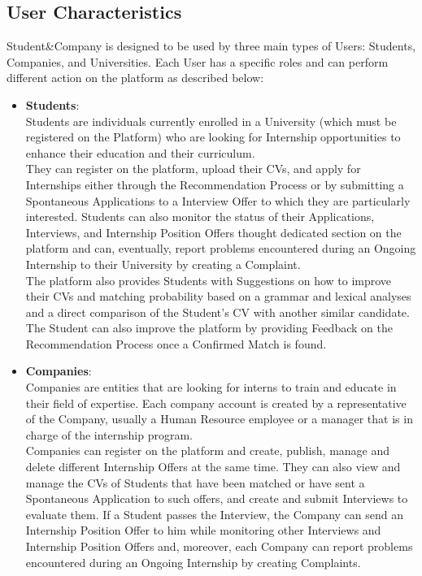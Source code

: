 \subsection{User Characteristics}
Student\&Company is designed to be used by three main types of Users: Students, Companies, and Universities. Each User has a specific roles and can perform different action on the platform as described below:
\begin{itemize}
  \item \textbf{Students}: \\
    Students are individuals currently enrolled in a University (which must be registered on the Platform) who are looking for Internship opportunities to enhance their education and their curriculum. \\
    They can register on the platform, upload their CVs, and apply for Internships either through the Recommendation Process or by submitting a Spontaneous Applications to a Interview Offer to which they are particularly interested. Students can also monitor the status of their Applications, Interviews, and Internship Position Offers thought dedicated section on the platform and can, eventually, report problems encountered during an Ongoing Internship to their University by creating a Complaint.\\
    The platform also provides Students with Suggestions on how to improve their CVs and matching probability based on a grammar and lexical analyses and a direct comparison of the Student's CV with another similar candidate. The Student can also improve the platform by providing Feedback on the Recommendation Process once a Confirmed Match is found.
  \item \textbf{Companies}:\\
    Companies are entities that are looking for interns to train and educate in their field of expertise. Each company account is created by a representative of the Company, usually a Human Resource employee or a manager that is in charge of the internship program. \\
    Companies can register on the platform and create, publish, manage and delete different Internship Offers at the same time. They can also view and manage the CVs of Students that have been matched or have sent a Spontaneous Application to such offers, and create and submit Interviews to evaluate them. If a Student passes the Interview, the Company can send an Internship Position Offer to him while monitoring other Interviews and Internship Position Offers and, moreover, each Company can report problems encountered during an Ongoing Internship by creating Complaints.\\

\end{itemize}
